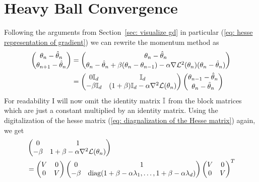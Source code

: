 \section{Heavy Ball Convergence}

Following the arguments from Section~\ref{sec: visualize gd} in particular
(\ref{eq: hesse representation of gradient}) we can rewrite the momentum
method as
\begin{align*}
	\begin{pmatrix}
		\theta_n - \hat{\theta}_n \\
		\theta_{n+1} - \hat{\theta}_n
	\end{pmatrix}
	&=
	\begin{pmatrix}
		\theta_n - \hat{\theta}_n \\
		\theta_n - \hat{\theta}_n + \beta (\theta_n - \theta_{n-1})
		- \alpha \nabla\mathcal{L}^2(\theta_n)(\theta_n -\hat{\theta}_n)
	\end{pmatrix}\\
	&=
	\begin{pmatrix}
		0\mathbb{I}_d & \mathbb{I}_d \\
		-\beta\mathbb{I}_d
		& (1+\beta)\mathbb{I}_d -\alpha \nabla^2\mathcal{L}(\theta_n)
	\end{pmatrix}
	\begin{pmatrix}
		\theta_{n-1} - \hat{\theta}_n \\
		\theta_n - \hat{\theta}_n
	\end{pmatrix}
\end{align*}
%
For readability I will now omit the identity matrix \(\mathbb{I}\) from the
block matrices which are just a constant multiplied by an identity matrix.
Using the digitalization of the hesse matrix (\ref{eq: diagnalization of the
Hesse matrix}) again, we get
%
\begin{align*}
	&\begin{pmatrix}
		0 & 1 \\
		-\beta & 1+\beta -\alpha \nabla^2\mathcal{L}(\theta_n)
	\end{pmatrix}\\
	&=
	\begin{pmatrix}
		V & 0 \\
		0 & V
	\end{pmatrix}	
	\begin{pmatrix}
		0 & 1 \\
		-\beta &
		\text{diag}(1+\beta -\alpha\lambda_1, \dots, 
		1+\beta -\alpha\lambda_d)
	\end{pmatrix}
	\begin{pmatrix}
		V & 0 \\
		0 & V
	\end{pmatrix}^T
\end{align*}
